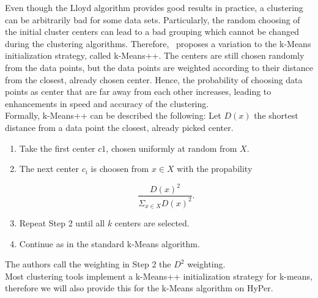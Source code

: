 Even though the Lloyd algorithm provides good results in practice, a clustering can be arbitrarily bad for some data sets. Particularly, the random choosing of the initial cluster centers can lead to a bad grouping which cannot be changed during the clustering algorithms. Therefore,~\cite{kmeans++} proposes a variation to the k-Means initialization strategy, called k-Means++. The centers are still chosen randomly from the data points, but the data points are weighted according to their distance from the closest, already chosen center. Hence, the probability of choosing data points as center that are far away from each other increases, leading to enhancements in speed and accuracy of the clustering.
\\
Formally, k-Means++ can be described the following:
Let $D(x)$ the shortest distance from a data point the closest, already picked center. 

\begin{enumerate} 
\item Take the first center $c1$, chosen uniformly at random from $X$.
\item The next center $c_i$ is choosen from $x \in X$ with the propability 

\begin{equation*}
\frac {D(x)^2} {\Sigma_{x \in X} D(x)^2}.
\end{equation*}

\item Repeat Step 2 until all $k$ centers are selected.
\item Continue as in the standard k-Means algorithm.
\end{enumerate}

The authors call the weighting in Step 2 the $D^2$ weighting.
\\
Most clustering tools implement a k-Means++ initialization strategy for k-means, therefore we will also provide this for the k-Means algorithm on HyPer.


